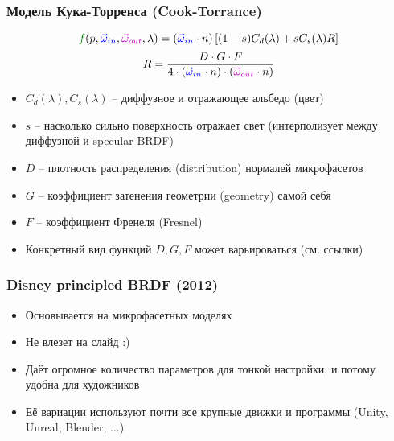 \documentclass[10pt]{beamer}
\begin{document}
\begin{frame}[fragile]
\frametitle{Модель Кука-Торренса (Cook-Torrance)}
\begin{equation*}
{\color{green}f}(p, {\color{blue}\vec\omega_{in}}, {\color{magenta}\vec\omega_{out}}, \lambda) = ({\color{blue}\vec\omega_{in}} \cdot n)
\left[ (1-s) C_d(\lambda) + s C_s(\lambda) R\right]
\end{equation*}
\begin{equation*}
R = \frac{D \cdot G \cdot F}{4 \cdot ({\color{blue}\vec\omega_{in}} \cdot n) \cdot ({\color{magenta}\vec\omega_{out}} \cdot n)}
\end{equation*}
\pause
\begin{itemize}
\item \begin{math}C_d(\lambda), C_s(\lambda)\end{math} -- диффузное и отражающее альбедо (цвет)
\item \begin{math}s\end{math} -- насколько сильно поверхность отражает свет (интерполизует между диффузной и specular BRDF)
\item \begin{math}D\end{math} -- плотность распределения (distribution) нормалей микрофасетов
\item \begin{math}G\end{math} -- коэффициент затенения геометрии (geometry) самой себя
\item \begin{math}F\end{math} -- коэффициент Френеля (Fresnel)
\item Конкретный вид функций \begin{math}D, G, F\end{math} может варьироваться (см. ссылки)
\end{itemize}
\end{frame}

\begin{frame}[fragile]
\frametitle{Disney principled BRDF (2012)}
\begin{itemize}
\item Основывается на микрофасетных моделях
\item Не влезет на слайд :)
\item Даёт огромное количество параметров для тонкой настройки, и потому удобна для художников
\item Её вариации используют почти все крупные движки и программы (Unity, Unreal, Blender, ...)
\end{itemize}
\end{frame}
\end{document}
